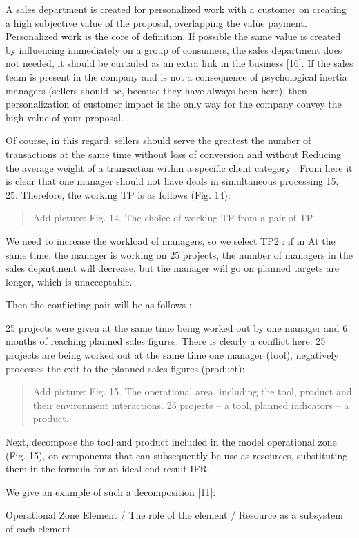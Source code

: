 \documentclass[11pt,a4paper]{book}
\newcommand{\addpicture}[1]{
  \begin{quote} Add picture: #1\end{quote}
}
\begin{document}
A sales department is created for personalized work with a customer on
creating a high subjective value of the proposal, overlapping the value
payment. Personalized work is the core of definition. If possible the same
value is created by influencing immediately on a group of consumers, the sales
department does not needed, it should be curtailed as an extra link in the
business [16]. If the sales team is present in the company and is not a
consequence of psychological inertia managers (sellers should be, because they
have always been here), then personalization of customer impact is the only
way for the company convey the high value of your proposal.

Of course, in this regard, sellers should serve the greatest the number of
transactions at the same time without loss of conversion and without Reducing
the average weight of a transaction within a specific client category . From
here it is clear that one manager should not have deals in simultaneous
processing 15, 25. Therefore, the working TP is as follows (Fig. 14):

\addpicture{Fig. 14. The choice of working TP from a pair of TP}

We need to increase the workload of managers, so we select TP2 : if in At the
same time, the manager is working on 25 projects, the number of managers in
the sales department will decrease, but the manager will go on planned targets
are longer, which is unacceptable.

Then the conflicting pair will be as follows :

25 projects were given at the same time being worked out by one manager and 6
months of reaching planned sales figures.  There is clearly a conflict here:
25 projects are being worked out at the same time one manager (tool),
negatively processes the exit to the planned sales figures (product):

\addpicture{Fig. 15. The operational area, including the tool, product and
  their environment interactions. 25 projects -- a tool, planned indicators --
  a product.}

Next, decompose the tool and product included in the model operational zone
(Fig. 15), on components that can subsequently be use as resources,
substituting them in the formula for an ideal end result IFR.

We give an example of such a decomposition [11]:


Operational Zone Element / The role of the element / Resource as a subsystem
of each element
\end{document}
